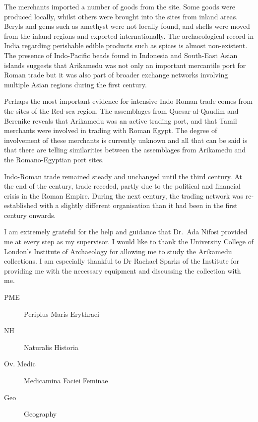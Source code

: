 The merchants imported a number of goods from the site. Some goods were produced locally, whilst others were brought into the sites from inland areas. Beryls and gems such as amethyst were not locally found, and shells were moved from the inland regions and exported internationally. The archaeological record in India regarding perishable edible products such as spices is almost non-existent. The presence of Indo-Pacific beads found in Indonesia and South-East Asian islands suggests that Arikamedu was not only an important mercantile port for Roman trade but it was also part of broader exchange networks involving multiple Asian regions during the first century\AD.

Perhaps the most important evidence for intensive Indo-Roman trade comes from the sites of the Red-sea region. The assemblages from Quesar-al-Qaudim and Berenike reveals that Arikamedu was an active trading port, and that Tamil merchants were involved in trading with Roman Egypt. The degree of involvement of these merchants is currently unknown and all that can be said is that there are telling similarities between the assemblages from Arikamedu and the Romano-Egyptian port sites.

Indo-Roman trade remained steady and unchanged until the third century\AD. At the end of the century, trade receded, partly due to the political and financial crisis in the Roman Empire. During the next century, the trading network was re-established with a slightly different organisation than it had been in the first century onwards.


I am extremely grateful for the help and guidance that Dr.~Ada Nifosi provided me at every step as my supervisor. I would like to thank the University College of London’s Institute of Archaeology for allowing me to study the Arikamedu collections. I am especially thankful to Dr Rachael Sparks of the Institute for providing me with the necessary equipment and discussing the collection with me.

\IJSRAseparator

\begin{description}
\item[PME] Periplus Maris Erythraei
\item[NH] Naturalis Historia
\item[Ov. Medic] Medicamina Faciei Feminae
\item[Geo] Geography
\end{description}

\IJSRAclosing%

